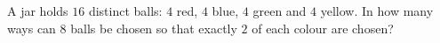 A jar holds $16$ distinct balls: $4$ red, $4$ blue, $4$ green and $4$ yellow. In how many ways can $8$ balls be chosen so that exactly $2$ of each colour are chosen?
